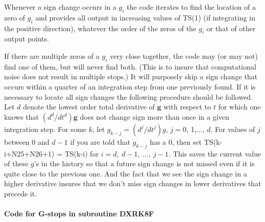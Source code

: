 \documentclass[twoside]{MATH77}
\begin{document}
Whenever a sign change occurs in a $g_i$ the code iterates to find the
location of a zero of $g_i$ and provides all output in increasing
values of TS(1) (if integrating in the positive direction), whatever
the order of the zeros of the $g_i$ or that of other output points.

If there are multiple zeros of a $g_i$ very close together, the code
may (or may not) find one of them, but will never find both.  (This is
to insure that computational noise does not result in multiple stops.)
It will purposely skip a sign change that occurs within a quarter of
an integration step from one previously found.  If it is necessary to
locate all sign changes the following procedure should be followed.
Let $d$ denote the lowest order total derivative of ${\mathbf g}$ with
respect to $t$ for which one knows that $(d^d/dt^d){\mathbf g}$ does
not change sign more than once in a given integration step.  For some
$k$, let $g_{k-j}=(d^j/dt^j)g$, $j=0$, 1,..., $d$.  For values
of $j$ between 0 and $d-1$ if you are told that $g_{k-j}$ has a 0,
then set TS(k-i+N25+N26+1) = TS(k-i) for $i = d,\ d-1,\ \ldots,\ j-1$.
This saves the current value of these $g$'s in the history so that a
future sign change is not missed even if it is quite close to the
previous one.  And the fact that we see the sign change in a higher
derivative insures that we don't miss sign changes in lower
derivatives that precede it.

\paragraph{Code for G-stops in subroutine DXRK8F}
\end{document}
